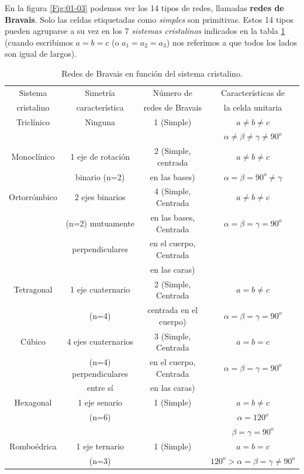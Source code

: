 En la figura \ref{Fig:01-03} podemos ver los 14 tipos de redes, llamadas {\bf redes de Bravais}. Solo las celdas etiquetadas como {\it simples} son primitivas. Estos 14 tipos pueden agruparse a su vez en los 7 {\it sistemas cristalinos} indicados en la  tabla \ref{Tab:01-01} (cuando escribimos $a=b=c$ (o $a_1=a_2=a_3$) nos referimos a que todos los lados son igual de largos).

\begin{table}[h!] \centering
    \begin{tabular}{cccc}
        Sistema  & Simetría  & Número de & Características de \\ 
        cristalino & característica & redes de Bravais & la celda unitaria \\
        \hline \hline 
        Triclínico & Ninguna & 1 (Simple) & $a \neq b \neq c$ \\
        & & & $\alpha \neq \beta \neq \gamma \neq 90^o$ \\ \hline
        Monoclínico & 1 eje de rotación & 2 (Simple, centrada & $a \neq b \neq c$ \\
        & binario (n=2) & en las bases) & $\alpha = \beta = 90^o \neq \gamma$ \\ \hline Ortorrómbico & 2 ejes binarios & 4 (Simple, Centrada & $a \neq b \neq c$ \\
        & (n=2) mutuamente & en las bases, Centrada & $ \alpha = \beta = \gamma = 90^o$ \\
        & perpendiculares & en el cuerpo, Centrada & \\
        & & en las caras) & \\ \hline
        Tetragonal  & 1 eje cuaternario & 2 (Simple, Centrada & $a=b\neq c$ \\
        & (n=4) & centrada en el cuerpo) & $ \alpha = \beta = \gamma = 90^o$ \\ \hline
        Cúbico & 4 ejes cuaternarios & 3 (Simple, Centrada & $a=b=c$ \\
        & (n=4) perpendiculares & en el cuerpo, Centrada & $ \alpha = \beta = \gamma = 90^o$ \\ 
        & entre sí & en las caras)  & \\ \hline 
        Hexagonal & 1 eje senario & 1 (Simple) & $a=b\neq c$ \\
        & (n=6) & & $\alpha=120^o$  \\
        & & & $\beta = \gamma = 90^o$ \\ \hline
        Romboédrica& 1 eje ternario & 1 (Simple) & $a=b=c$ \\ 
        & (n=3) & & $120^o > \alpha = \beta = \gamma \neq 90^o$\\ \hline
    \end{tabular}
    \caption{Redes de Bravais en función del sistema cristalino.}
    \label{Tab:01-01}
\end{table}


